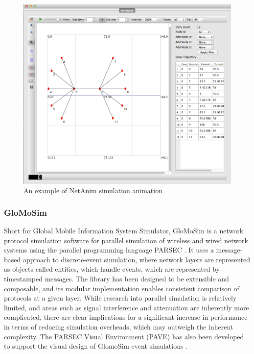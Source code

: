 \begin{figure}
\centering	
\includegraphics[scale=0.4]{img/netanim}	
\caption{An example of NetAnim simulation animation}
\end{figure}

\subsubsection{GloMoSim}
Short for Global Mobile Information System Simulator, GloMoSim is a network protocol simulation software for parallel simulation of wireless and wired network systems using the parallel programming language PARSEC \cite{zengxiang1998}. It uses a message-based approach to discrete-event simulation, where network layers are represented as objects called entities, which handle events, which are represented by timestamped messages. The library has been designed to be extensible and composable, and its modular implementation enables consistent comparison of protocols at a given layer. While research into parallel simulation is relatively limited, and areas such as signal interference and attenuation are inherently more complicated, there are clear implications for a significant increase in performance in terms of reducing simulation overheads, which may outweigh the inherent complexity. The PARSEC Visual Environment (PAVE) has also been developed to support the visual design of GlomoSim event simulations \cite{luchogie2006}.

